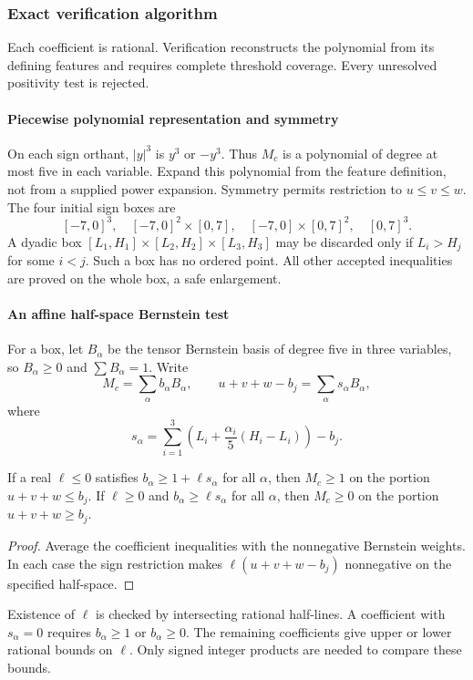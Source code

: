 \subsubsection{Exact verification algorithm}\label{ms:finite:n3:sec:check}
Each coefficient is rational. Verification reconstructs the polynomial from its defining features and requires complete threshold coverage. Every unresolved positivity test is rejected.

\paragraph{Piecewise polynomial representation and symmetry}
On each sign orthant, $|y|^3$ is $y^3$ or $-y^3$. Thus $M_c$ is a polynomial
of degree at most five in each variable. Expand this polynomial
from the feature definition, not from a supplied power expansion. Symmetry
permits restriction to $u\le v\le w$. The four initial sign boxes are
\[
 [-7,0]^3,\quad[-7,0]^2\times[0,7],\quad
 [-7,0]\times[0,7]^2,\quad[0,7]^3.
\]
A dyadic box $[L_1,H_1]\times[L_2,H_2]\times[L_3,H_3]$ may be discarded
only if $L_i>H_j$ for some $i<j$. Such a box has no ordered point. All other
accepted inequalities are proved on the whole box, a safe enlargement.

\paragraph{An affine half-space Bernstein test}
For a box, let $B_\alpha$ be the tensor Bernstein basis of degree five in
three variables, so $B_\alpha\ge0$ and $\sum B_\alpha=1$. Write
\[
 M_c=\sum_\alpha b_\alpha B_\alpha,\qquad
 u+v+w-b_j=\sum_\alpha s_\alpha B_\alpha,
\]
where
\[
 s_\alpha=\sum_{i=1}^3\left(L_i+\frac{\alpha_i}{5}(H_i-L_i)\right)-b_j.
\]
\begin{lemma}\label{ms:finite:n3:lem:affine}
If a real $\ell\le0$ satisfies $b_\alpha\ge1+\ell s_\alpha$ for all
$\alpha$, then $M_c\ge1$ on the portion $u+v+w\le b_j$.
If $\ell\ge0$ and $b_\alpha\ge\ell s_\alpha$ for all $\alpha$, then
$M_c\ge0$ on the portion $u+v+w\ge b_j$.
\end{lemma}
\begin{proof}
Average the coefficient inequalities with the nonnegative Bernstein weights.
In each case the sign restriction makes $\ell(u+v+w-b_j)$ nonnegative
on the specified half-space.
\end{proof}
Existence of $\ell$ is checked by intersecting rational half-lines. A
coefficient with $s_\alpha=0$ requires $b_\alpha\ge1$ or $b_\alpha\ge0$.
The remaining coefficients give upper or lower rational bounds on $\ell$.
Only signed integer products are needed to compare these bounds.

